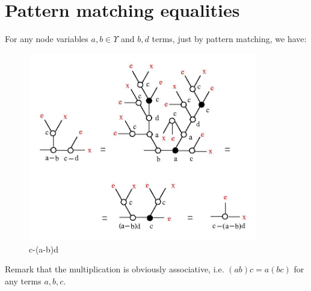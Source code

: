 \section{Pattern matching equalities}
\label{spatmat}

For any node variables $a, b \in \Upsilon$ and $b, d$ terms, just by pattern matching, we have:  

\begin{figure}[h]
   \centerline{\includegraphics[width=100mm]{jpg/accept_4.jpg}}
\caption{ c-(a-b)d }
\label{fig1}
\end{figure}

Remark that the multiplication is obviously associative, i.e. $(ab)c = a(bc)$ for any terms $a, b, c$.



